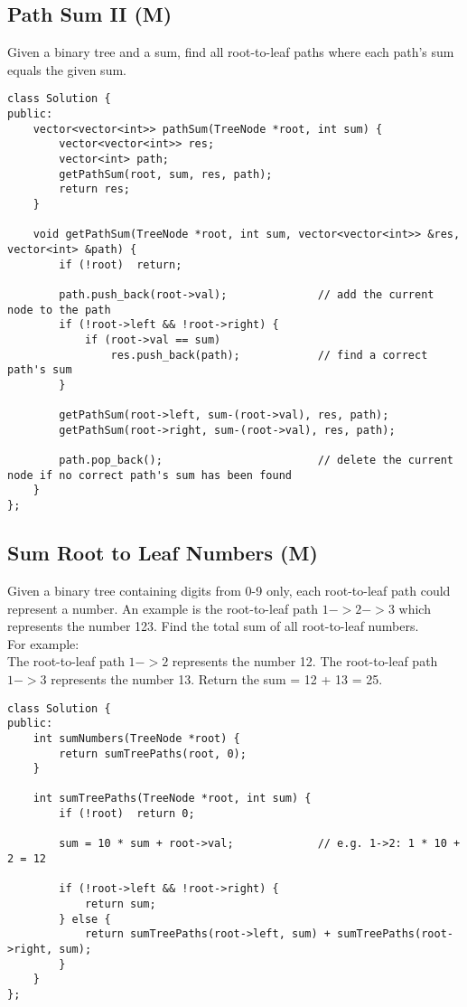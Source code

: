 \subsection{Path Sum II (M)}
Given a binary tree and a sum, find all root-to-leaf paths where each path's sum equals the given sum. \\
 
\begin{lstlisting}
class Solution {
public:
    vector<vector<int>> pathSum(TreeNode *root, int sum) {
        vector<vector<int>> res;
        vector<int> path;
        getPathSum(root, sum, res, path);
        return res;
    }
    
    void getPathSum(TreeNode *root, int sum, vector<vector<int>> &res, vector<int> &path) {
        if (!root)  return;
        
        path.push_back(root->val);              // add the current node to the path
        if (!root->left && !root->right) {
            if (root->val == sum)
                res.push_back(path);            // find a correct path's sum
        }
        
        getPathSum(root->left, sum-(root->val), res, path);
        getPathSum(root->right, sum-(root->val), res, path);

        path.pop_back();                        // delete the current node if no correct path's sum has been found
    }
};
\end{lstlisting}


\subsection{Sum Root to Leaf Numbers (M)}
Given a binary tree containing digits from 0-9 only, each root-to-leaf path could represent a number. An example is the root-to-leaf path $1->2->3$ which represents the number 123. Find the total sum of all root-to-leaf numbers.\\

For example: \\
The root-to-leaf path $1->2$ represents the number 12. The root-to-leaf path $1->3$ represents the number 13. Return the sum = 12 + 13 = 25. \\

\begin{lstlisting}
class Solution {
public:
    int sumNumbers(TreeNode *root) {
        return sumTreePaths(root, 0);
    }
    
    int sumTreePaths(TreeNode *root, int sum) {
        if (!root)  return 0;
        
        sum = 10 * sum + root->val;             // e.g. 1->2: 1 * 10 + 2 = 12
        
        if (!root->left && !root->right) {
            return sum;
        } else {
            return sumTreePaths(root->left, sum) + sumTreePaths(root->right, sum);
        }
    }
};
\end{lstlisting}


